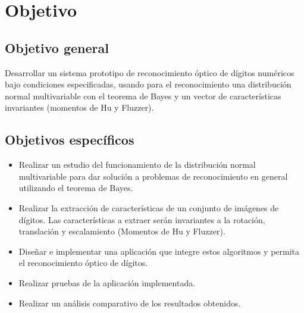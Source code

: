 \documentclass[a4paper, 11pt, oneside]{report}
\begin{document}
\section{Objetivo}
\label{sect:objective}
\subsection{Objetivo general}
Desarrollar un sistema prototipo de reconocimiento óptico de dígitos numéricos bajo condiciones especificadas, usando para el reconocimiento una distribución normal multivariable con el teorema de Bayes y un vector de características invariantes (momentos de Hu y Fluzzer).
\subsection{Objetivos específicos}
\begin{itemize}
\item Realizar un estudio del funcionamiento de la distribución normal multivariable para dar solución a problemas de reconocimiento en general utilizando el teorema de Bayes.
\item Realizar la extracción de características de un conjunto de imágenes de dígitos. Las características a extraer serán invariantes a la rotación, translación y escalamiento (Momentos de Hu y Fluzzer).
\item Diseñar e implementar una aplicación que integre estos algoritmos y permita el reconocimiento óptico de dígitos.
\item Realizar pruebas de la aplicación implementada.
\item Realizar un análisis comparativo de los resultados obtenidos.
\end{itemize}
\end{document}
